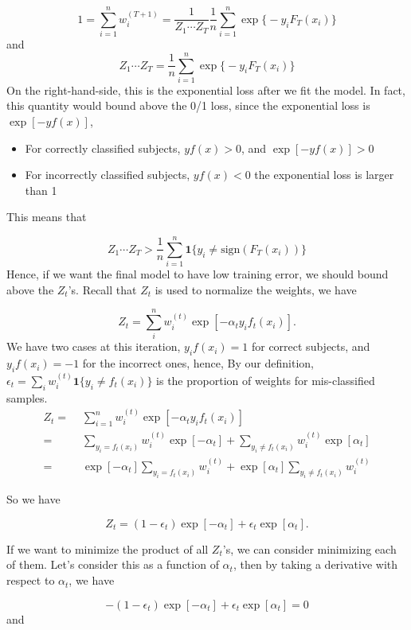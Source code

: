\documentclass[
]{book}
\providecommand{\tightlist}{%
  \setlength{\itemsep}{0pt}\setlength{\parskip}{0pt}}
\theoremstyle{definition}
\theoremstyle{definition}
\theoremstyle{definition}
\theoremstyle{definition}
\theoremstyle{remark}
\begin{document}
\[1 = \sum_{i = 1}^n w_i^{(T+1)} = \frac{1}{Z_1\cdots Z_T} \frac{1}{n} \sum_{i = 1}^n \exp\big\{ - y_i F_T(x_i) \big\}\]
and
\[Z_1\cdots Z_T = \frac{1}{n} \sum_{i = 1}^n \exp\big\{ - y_i F_T(x_i) \big\}\]
On the right-hand-side, this is the exponential loss after we fit the model. In fact, this quantity would bound above the 0/1 loss, since the exponential loss is \(\exp[ - y f(x) ]\),

\begin{itemize}
\tightlist
\item
  For correctly classified subjects, \(y f(x) > 0\), and \(\exp[ - y f(x) ] > 0\)
\item
  For incorrectly classified subjects, \(y f(x) < 0\) the exponential loss is larger than 1
\end{itemize}

This means that

\[Z_1\cdots Z_T > \frac{1}{n} \sum_{i = 1}^n \mathbf{1} \big\{ y_i \neq \text{sign}(F_T(x_i)) \big\}\]
Hence, if we want the final model to have low training error, we should bound above the \(Z_t\)'s. Recall that \(Z_t\) is used to normalize the weights, we have

\[Z_t = \sum_i^{n} w_i^{(t)} \exp[ - \alpha_t y_i f_t(x_i) ].\]
We have two cases at this iteration, \(y_i f(x_i) = 1\) for correct subjects, and \(y_i f(x_i) = -1\) for the incorrect ones, hence,
By our definition, \(\epsilon_t = \sum_i w_i^{(t)} \mathbf{1} \big\{ y_i \neq f_t(x_i) \big\}\) is the proportion of weights for mis-classified samples.
\begin{align}
Z_t =& \,\,\sum_{i=1}^n w_i^{(t)} \exp[ - \alpha_t y_i f_t(x_i)] \nonumber\\
=&\,\,\sum_{y_i = f_t(x_i)} w_i^{(t)} \exp[ - \alpha_t ] +  \sum_{y_i \neq f_t(x_i)} w_i^{(t)} \exp[ \alpha_t ] \nonumber\\
=& \,\, \exp[ - \alpha_t ] \sum_{y_i = f_t(x_i)} w_i^{(t)} + \exp[ \alpha_t ] \sum_{y_i \neq f_t(x_i)} w_i^{(t)}
\end{align}

So we have

\[ Z_t = (1 - \epsilon_t) \exp[ - \alpha_t ] + \epsilon_t \exp[ \alpha_t ].\]

If we want to minimize the product of all \(Z_t\)'s, we can consider minimizing each of them. Let's consider this as a function of \(\alpha_t\), then by taking a derivative with respect to \(\alpha_t\), we have

\[ - (1 - \epsilon_t) \exp[ - \alpha_t ] + \epsilon_t \exp[ \alpha_t ] = 0\]
and
\end{document}
